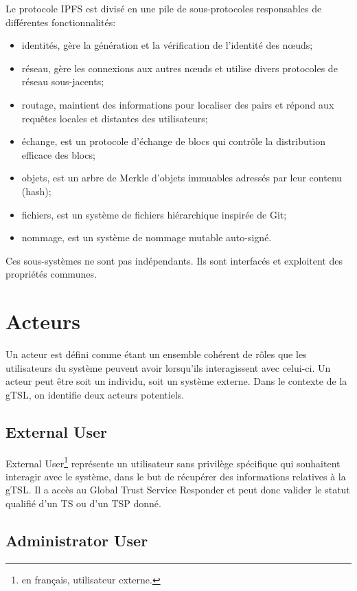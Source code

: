 \documentclass{tnreport}
\begin{document}
Le protocole IPFS est divisé en une pile de sous-protocoles responsables de différentes fonctionnalités:
\begin{itemize}
	\item identités, gère la génération et la vérification de l'identité des nœuds;
	\item réseau, gère les connexions aux autres nœuds et utilise divers protocoles de réseau sous-jacents;
	\item routage, maintient des informations pour localiser des pairs et répond aux requêtes locales et distantes des utilisateurs;
	\item échange, est un protocole d'échange de blocs qui contrôle la distribution efficace des blocs;
	\item objets, est un arbre de Merkle d'objets immuables adressés par leur contenu (hash);
	\item fichiers, est un système de fichiers hiérarchique inspirée de Git;
	\item nommage, est un système de nommage mutable auto-signé.
\end{itemize}
Ces sous-systèmes ne sont pas indépendants. Ils sont interfacés et exploitent des propriétés communes.

\section{Acteurs}

Un acteur est défini comme étant un ensemble cohérent de rôles que les utilisateurs du système peuvent avoir lorsqu'ils interagissent avec celui-ci. Un acteur peut être soit un individu, soit un système externe. Dans le contexte de la gTSL, on identifie deux acteurs potentiels.

\subsection{External User}

External User\footnote{en français, utilisateur externe.} représente un utilisateur sans privilège spécifique qui souhaitent interagir avec le système, dans le but de récupérer des informations relatives à la gTSL. Il a accès au Global Trust Service Responder et peut donc valider le statut qualifié d'un TS ou d'un TSP donné.

\subsection{Administrator User}
\end{document}
